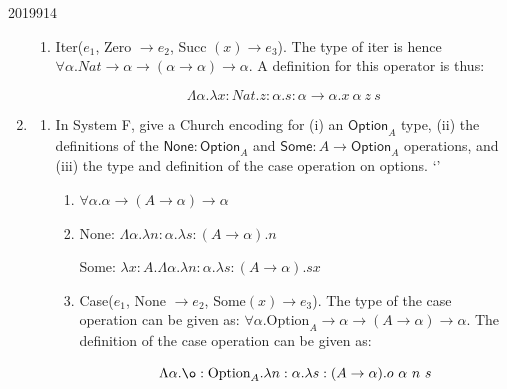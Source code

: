 \documentclass[10pt,\jkfside,a4paper]{article}
\newcommand{\answer}[1]{
    \begin{tcolorbox}[colframe=black, colback=white, sharp corners, boxrule=0.2mm, breakable]
        #1
    \end{tcolorbox}
}
\begin{document}
\begin{examquestion}{2019}{9}{14}
\begin{enumerate}
{\begin{enumerate}
                    Succ: $\lambda x: Nat. \Lambda \alpha. \lambda z:\alpha . \lambda s:\alpha \to \alpha. s (x \alpha z s)$

                    \item
                    Iter($e_1$, Zero $\to e_2$, Succ $(x) \to e_3$). The type of iter is hence $\forall \alpha. Nat \to \alpha \to (\alpha \to \alpha) \to \alpha$. A definition for this operator is thus: 

                    \[ 
                        \Lambda \alpha. \lambda x: Nat. z: \alpha. s: \alpha \to \alpha. x \ \alpha \ z \ s
                    \]

                \end{enumerate}
            }

        \item
            \begin{enumerate}
                \item
                    In System F, give a Church encoding for (i) an $\mathsf{Option}_A$
                    type, (ii) the definitions of the
                    $\mathsf{None} : \mathsf{Option}_A$ and
                    $\mathsf{Some} : A \to \mathsf{Option}_A$ operations, and (iii) the
                    type and definition of the case operation on options.
                    `'
                    \answer{ 
                        \begin{enumerate} 
                            \item 
                            $\forall \alpha. \alpha \to (A \to \alpha) \to \alpha$
     
                            \item
                            None: $\Lambda \alpha. \lambda n: \alpha. \lambda s: (A \to \alpha). n$

                            Some: $\lambda x: A. \Lambda \alpha. \lambda n: \alpha. \lambda s: (A \to \alpha). s x$
     
                            \item
                            Case($e_1$, None $\to e_2$, Some$(x) \to e_3$). The type of the case operation can be given as: $\forall \alpha. \text{Option}_A \to \alpha \to (A \to \alpha) \to \alpha$. The definition of the case operation can be given as: 
                            
                            \[ 
                                \Lambda \alpha. \o: \text{Option}_A. \lambda n: \alpha. \lambda s: (A \to \alpha). o \ \alpha \ n \ s
                            \]
     

\end{enumerate}}
\end{enumerate}
\end{enumerate}
\end{examquestion}
\end{document}

